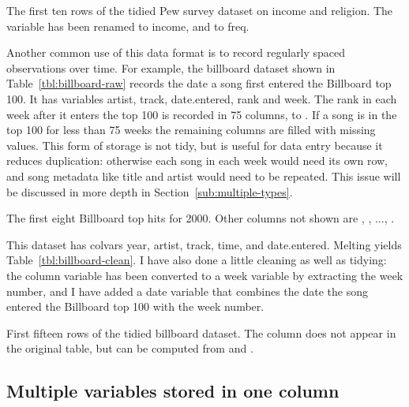\documentclass[article]{jss}
\begin{document}
\begin{table}[htbp]
  \centering
  
  \caption{The first ten rows of the tidied Pew survey dataset on income and religion. The variable  has been renamed to income, and  to freq.}
  \label{tbl:pew-clean}
\end{table}

Another common use of this data format is to record regularly spaced observations over time. For example, the billboard dataset shown in Table~\ref{tbl:billboard-raw} records the date a song first entered the Billboard top 100. It has variables artist, track, date.entered, rank and week. The rank in each week after it enters the top 100 is recorded in 75 columns,  to . If a song is in the top 100 for less than 75 weeks the remaining columns are filled with missing values.  This form of storage is not tidy, but is useful for data entry because it reduces duplication: otherwise each song in each week would need its own row, and song metadata like title and artist would need to be repeated. This issue will be discussed in more depth in Section~\ref{sub:multiple-types}.

\begin{table}[htbp]
  \centering
  
  \caption{The first eight Billboard top hits for 2000. Other columns not shown are , , ..., .}
  \label{tbl:billboard-raw}
\end{table}

This dataset has colvars year, artist, track, time, and date.entered. Melting yields Table~\ref{tbl:billboard-clean}. I have also done a little cleaning as well as tidying: the column variable has been converted to a week variable by extracting the week number, and I have added a date variable that combines the date the song entered the Billboard top 100 with the week number.

\begin{table}[htbp]
  \centering
  
  \caption{First fifteen rows of the tidied billboard dataset. The  column does not appear in the original table, but can be computed from  and .}
  \label{tbl:billboard-clean}
\end{table}

\subsection{Multiple variables stored in one column}
\end{document}

